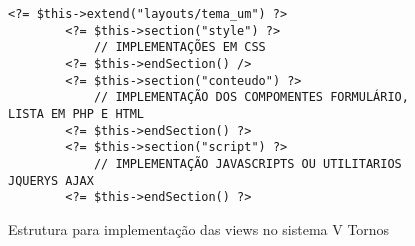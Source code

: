 \begin{figure}[hb!]
    \centering
    \begin{lstlisting}[style=phplisting]
        <?= $this->extend("layouts/tema_um") ?>
        <?= $this->section("style") ?>
            // IMPLEMENTAÇÕES EM CSS 
        <?= $this->endSection() />
        <?= $this->section("conteudo") ?>
            // IMPLEMENTAÇÃO DOS COMPOMENTES FORMULÁRIO, LISTA EM PHP E HTML
        <?= $this->endSection() ?>
        <?= $this->section("script") ?>
            // IMPLEMENTAÇÃO JAVASCRIPTS OU UTILITARIOS JQUERYS AJAX
        <?= $this->endSection() ?>
    \end{lstlisting}
    \caption{Estrutura para implementação das views no sistema V Tornos}
    \label{fig:layouts_tema_um}
\end{figure}